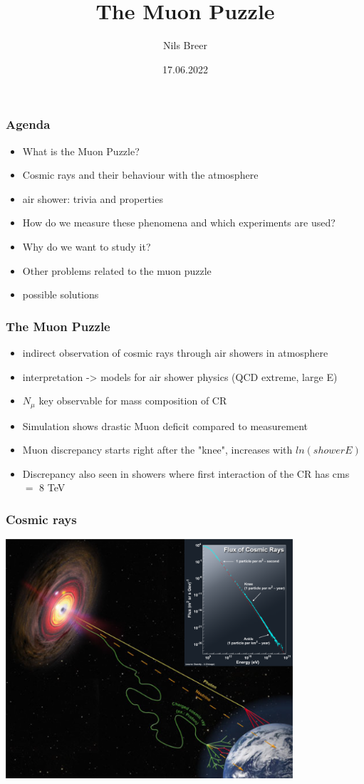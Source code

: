 \documentclass[aspectratio=1610, 9pt]{beamer}
\title{The Muon Puzzle}
\author[N.Breer]{Nils Breer}
\institute{Fakultät Physik}
\date{17.06.2022}
\begin{document}
\maketitle

\begin{frame}\frametitle{Agenda}
  \begin{itemize}
    \item What is the Muon Puzzle?
    \item Cosmic rays and their behaviour with the atmosphere
    \item air shower: trivia and properties
    \item How do we measure these phenomena and which experiments are used?
    \item Why do we want to study it?
    \item Other problems related to the muon puzzle
    \item possible solutions
  \end{itemize}
\end{frame}

\begin{frame}\frametitle{The Muon Puzzle}
  \begin{itemize}
    \item indirect observation of cosmic rays through air showers in atmosphere
    \item interpretation -> models for air shower physics (QCD extreme, large E)
    \item $N_\mu$ key observable for mass composition of CR
    \item Simulation shows drastic Muon deficit compared to measurement
    \item Muon discrepancy starts right after the "knee", increases with $ln(shower E)$
    \item Discrepancy also seen in showers where first interaction of the CR has cms $=$ 8 TeV
  \end{itemize}
\end{frame}

\begin{frame}\frametitle{Cosmic rays}
  \includegraphics[width=0.8\textwidth]{CR_cta.png}
\end{frame}
\end{document}
